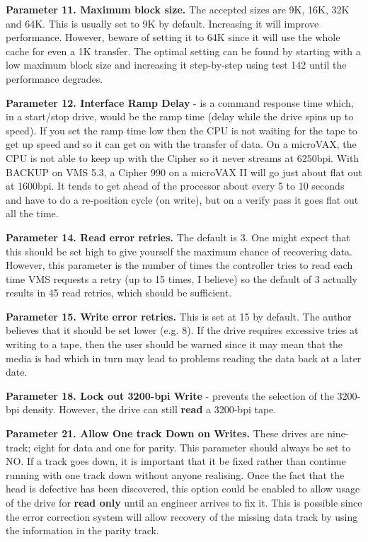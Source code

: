 {\bf Parameter 11.  Maximum block size.} The accepted sizes are
9K, 16K, 32K and 64K. This is usually set to 9K by default.
Increasing it will improve performance. However, beware of setting it to 64K
since it will use the whole cache for even a 1K transfer. The optimal setting
can be found by starting with a low maximum block size and increasing it
step-by-step using test 142 until the performance degrades.


{\bf Parameter 12. Interface Ramp Delay} -  is a command
response time which, in a start/stop drive, would be the ramp time (delay while
the drive spins up to speed).  If you set the ramp time low then the CPU is not
waiting for the tape to get up speed and so it can get on with the transfer of
data. On a microVAX, the CPU is not able to keep up with the Cipher so it never
streams at 6250bpi.  With BACKUP on VMS 5.3, a Cipher 990 on a microVAX II will go
just about flat out at 1600bpi. It tends to get ahead of the processor about
every 5 to 10 seconds and have to do a re-position cycle (on write), but on a
verify pass it goes flat out all the time.

{\bf Parameter 14.  Read error retries.} The default is 3. One might  expect that this should be
set high to give yourself the maximum chance of recovering  data. However, this
parameter is the number of times the controller tries to read each time
VMS requests a retry (up to 15 times, I believe) so the default of 3 actually
results in 45 read retries, which should be sufficient.

{\bf Parameter 15.  Write error retries.}  This is set at 15 by default. The author believes that
it should be set lower (e.g. 8). If the drive requires excessive tries at
writing to  a tape, then the user should be warned since it may mean that the media
is bad which in turn may lead to problems reading the data back at a later
date.

{\bf Parameter 18. Lock out 3200-bpi Write} - prevents the selection of the
3200-bpi density. However, the drive can still {\bf read} a 3200-bpi tape.

{\bf Parameter 21.  Allow One track Down on Writes.} These drives are nine-track; eight for data
and one for parity. This parameter should always be set to NO. If a track goes down,
it is important that it be fixed rather than continue running with one
track down without anyone realising. Once the fact that the head is
defective has been discovered, this option could be enabled to allow
usage of the drive for {\bf read only} until an engineer arrives to fix it. This is
possible since the error correction system will allow recovery of the missing data track
by  using the information in the parity track.

